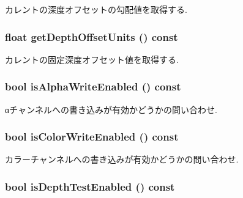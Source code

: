 カレントの深度オフセットの勾配値を取得する. \hypertarget{classm3g_1_1CompositingMode_add4c6c3bc01c1d0689e0588af79039f}{
\subsubsection[{getDepthOffsetUnits}]{\setlength{\rightskip}{0pt plus 5cm}float getDepthOffsetUnits () const}}
\label{classm3g_1_1CompositingMode_add4c6c3bc01c1d0689e0588af79039f}


カレントの固定深度オフセット値を取得する. \hypertarget{classm3g_1_1CompositingMode_bfcec134f769763d492011fc8ccadcce}{
\subsubsection[{isAlphaWriteEnabled}]{\setlength{\rightskip}{0pt plus 5cm}bool isAlphaWriteEnabled () const}}
\label{classm3g_1_1CompositingMode_bfcec134f769763d492011fc8ccadcce}


αチャンネルへの書き込みが有効かどうかの問い合わせ. \hypertarget{classm3g_1_1CompositingMode_35ffa21944393c774552003dd2cb03ea}{
\subsubsection[{isColorWriteEnabled}]{\setlength{\rightskip}{0pt plus 5cm}bool isColorWriteEnabled () const}}
\label{classm3g_1_1CompositingMode_35ffa21944393c774552003dd2cb03ea}


カラーチャンネルへの書き込みが有効かどうかの問い合わせ. \hypertarget{classm3g_1_1CompositingMode_4dd97b29a6e12c5e64477ab1546f93f1}{
\subsubsection[{isDepthTestEnabled}]{\setlength{\rightskip}{0pt plus 5cm}bool isDepthTestEnabled () const}}
\label{classm3g_1_1CompositingMode_4dd97b29a6e12c5e64477ab1546f93f1}


